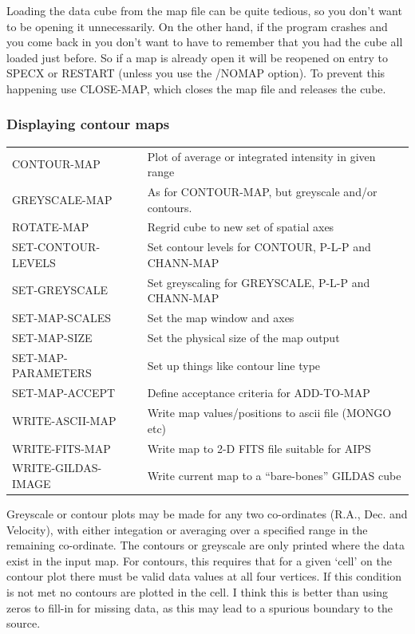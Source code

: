 \documentclass[11pt,twoside]{report}
\begin{document}
Loading the data cube from the map file can be quite tedious,  so you don't want to be opening it unnecessarily. On the other
hand, if the program crashes and you come back in you don't want to have to
remember that you had the cube all loaded just before. So if a map is already
open it will be reopened on entry to SPECX or RESTART (unless you use the
/NOMAP option).  To prevent this happening use CLOSE-MAP, which
closes the map file and releases the cube.

\subsubsection{Displaying contour maps}

\begin{tabular}{ll}
CONTOUR-MAP             & Plot of average or integrated intensity in given
                          range\\
GREYSCALE-MAP           & As for CONTOUR-MAP, but greyscale and/or contours.\\
ROTATE-MAP              & Regrid cube to new set of spatial axes\\
SET-CONTOUR-LEVELS      & Set contour levels for CONTOUR,
                          P-L-P and CHANN-MAP\\
SET-GREYSCALE           & Set greyscaling for GREYSCALE,
                          P-L-P and CHANN-MAP\\
SET-MAP-SCALES          & Set the map window and axes\\
SET-MAP-SIZE            & Set the physical size of the map output\\
SET-MAP-PARAMETERS      & Set up things like contour line type\\
SET-MAP-ACCEPT          & Define acceptance criteria for ADD-TO-MAP\\
WRITE-ASCII-MAP         & Write map values/positions to ascii file (MONGO etc)\\
WRITE-FITS-MAP          & Write map to 2-D FITS file suitable for AIPS\\
WRITE-GILDAS-IMAGE      & Write current map to a ``bare-bones'' GILDAS cube
\end{tabular}

Greyscale  or contour plots 
 may be made for any two co-ordinates (R.A., Dec. and
Velocity), with either integation or averaging over a specified range in the
remaining co-ordinate. The contours or greyscale are only printed where the
data exist in the input map. For contours, this requires that for a given
`cell' on the contour plot there must be valid data values at all four
vertices. If this condition is not met no contours are plotted in the cell. I
think this is better than using zeros to fill-in for missing data, as this may
lead to a spurious boundary to the source. 
\end{document}
